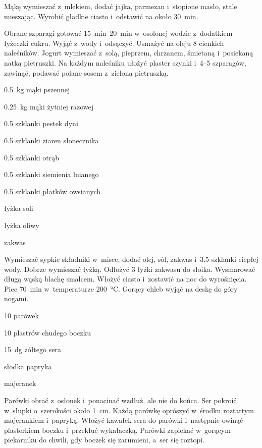 \documentclass[../kucharek.tex]{subfiles}
\begin{document}
Mąkę wymieszać z~mlekiem, dodać jajka, parmezan i~stopione masło, stale
mieszając. Wyrobić gładkie ciasto i~odstawić na około \qty{30}{\minute}.

Obrane szparagi gotować \qtyrange{15}{20}{\minute} w~osolonej wodzie
z~dodatkiem łyżeczki cukru. Wyjąć z~wody i~odsączyć. Usmażyć na oleju \num{8}
cienkich naleśników. Jogurt wymieszać z~solą, pieprzem, chrzanem, śmietaną
i~posiekaną natką pietruszki. Na każdym naleśniku ułożyć plaster szynki
i~\numrange{4}{5} szparagów, zawinąć, podawać polane sosem z~zieloną
pietruszką.


\begin{Ingred}
    \item \qty{.5}{\kilo\gram} mąki pszennej
    \item \qty{.25}{\kilo\gram} mąki żytniej razowej
    \item \num{.5} szklanki pestek dyni
    \item \num{.5} szklanki ziaren słonecznika
    \item \num{.5} szklanki otrąb
    \item \num{.5} szklanki siemienia lnianego
    \item \num{.5} szklanki płatków owsianych
    \item łyżka soli
    \item łyżka oliwy
    \item zakwas
\end{Ingred}

Wymieszać sypkie składniki w~misce, dodać olej, sól, zakwas i~\num{3.5}
szklanki ciepłej wody. Dobrze wymieszać łyżką. Odłożyć \num{3} łyżki zakwasu do
słoika. Wysmarować długą wąską blachę smalcem. Włożyć ciasto i~zostawić na noc
do wyrośnięcia. Piec \qty{70}{\minute} w~temperaturze \qty{200}{\celsius}.
Gorący chleb wyjąć na deskę do góry nogami.


\begin{Ingred}
    \item \num{10} parówek
    \item \num{10} plastrów chudego boczku
    \item \qty{15}{\deca\gram} żółtego sera
    \item słodka papryka
    \item majeranek
\end{Ingred}

Parówki obrać z~osłonek i~ponacinać wzdłuż, ale nie do końca. Ser pokroić
w~słupki o~szerokości około \qty{1}{\centi\metre}. Każdą parówkę oprószyć
w~środku roztartym majerankiem i~papryką. Włożyć kawałek sera do parówki
i~następnie owinąć plasterkiem boczku i~przekłuć wykałaczką. Parówki zapiekać
w~gorącym piekarniku do chwili, gdy boczek się zarumieni, a~ser się roztopi.
\end{document}
